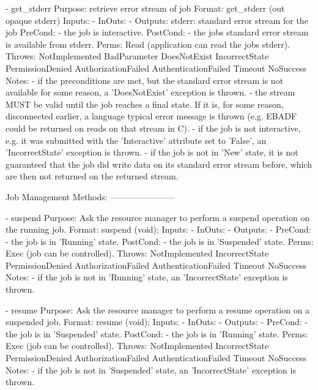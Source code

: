 \begin{myspec}
 
    - get_stderr
      Purpose:  retrieve error stream of job
      Format:   get_stderr         (out opaque stderr)
      Inputs:   -
      InOuts:   -
      Outputs:  stderr:             standard error stream for
                                    the job
      PreCond:  - the job is interactive.
      PostCond: - the jobs standard error stream is available 
                  from stderr.
      Perms:    Read (application can read the jobs stderr).
      Throws:   NotImplemented
                BadParameter
                DoesNotExist
                IncorrectState
                PermissionDenied
                AuthorizationFailed
                AuthenticationFailed
                Timeout
                NoSuccess
      Notes:    - if the preconditions are met, but the standard
                  error stream is not available for some 
                  reason, a 'DoesNotExist' exception is thrown.
                - the stream MUST be valid until the job reaches
                  a final state.  If it is, for some reason,
                  disconnected earlier, a language typical error
                  message is thrown (e.g. EBADF could be 
                  returned on reads on that stream in C).
                - if the job is not interactive, e.g. it was
                  submitted with the 'Interactive' attribute set
                  to 'False', an 'IncorrectState' exception is
                  thrown.
                - if the job is not in 'New' state, it is not
                  guaranteed that the job did write data on
                  its standard error stream before, which are
                  then not returned on the returned stream.
 
 
    Job Management Methods:
    -----------------------
 
    - suspend
      Purpose:  Ask the resource manager to perform a suspend
                operation on the running job.
      Format:   suspend       (void);
      Inputs:   -
      InOuts:   -
      Outputs:  -
      PreCond:  - the job is in 'Running' state.
      PostCond: - the job is in 'Suspended' state.
      Perms:    Exec (job can be controlled).
      Throws:   NotImplemented
                IncorrectState
                PermissionDenied
                AuthorizationFailed
                AuthenticationFailed
                Timeout
                NoSuccess
      Notes:    - if the job is not in 'Running' state, an
                  'IncorrectState' exception is thrown.
 
 
    - resume
      Purpose:  Ask the resource manager to perform a resume
                operation on a suspended job.
      Format:   resume             (void);
      Inputs:   -
      InOuts:   -
      Outputs:  -
      PreCond:  - the job is in 'Suspended' state.
      PostCond: - the job is in 'Running' state.
      Perms:    Exec (job can be controlled).
      Throws:   NotImplemented
                IncorrectState
                PermissionDenied
                AuthorizationFailed
                AuthenticationFailed
                Timeout
                NoSuccess
      Notes:    - if the job is not in 'Suspended' state, an
                  'IncorrectState' exception is thrown.
 

\end{myspec}
